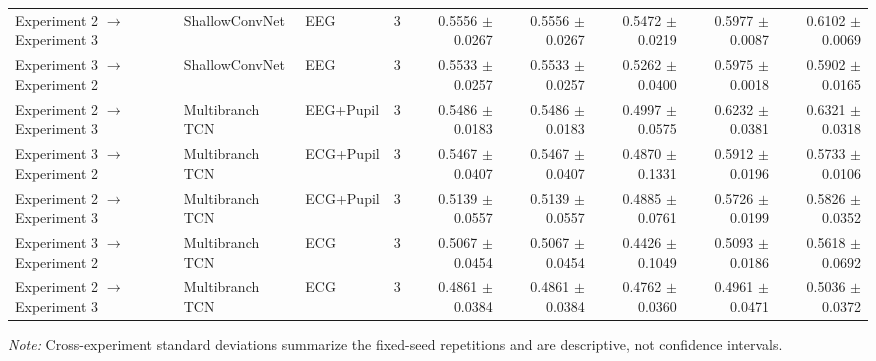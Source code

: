 \begin{table}[htbp]
{\begin{tabular}{lllrrrrrr}
Experiment 2 $\rightarrow$ Experiment 3 & ShallowConvNet & EEG & 3 & 0.5556 $\pm$ 0.0267 & 0.5556 $\pm$ 0.0267 & 0.5472 $\pm$ 0.0219 & 0.5977 $\pm$ 0.0087 & 0.6102 $\pm$ 0.0069 \\
Experiment 3 $\rightarrow$ Experiment 2 & ShallowConvNet & EEG & 3 & 0.5533 $\pm$ 0.0257 & 0.5533 $\pm$ 0.0257 & 0.5262 $\pm$ 0.0400 & 0.5975 $\pm$ 0.0018 & 0.5902 $\pm$ 0.0165 \\
Experiment 2 $\rightarrow$ Experiment 3 & Multibranch TCN & EEG+Pupil & 3 & 0.5486 $\pm$ 0.0183 & 0.5486 $\pm$ 0.0183 & 0.4997 $\pm$ 0.0575 & 0.6232 $\pm$ 0.0381 & 0.6321 $\pm$ 0.0318 \\
Experiment 3 $\rightarrow$ Experiment 2 & Multibranch TCN & ECG+Pupil & 3 & 0.5467 $\pm$ 0.0407 & 0.5467 $\pm$ 0.0407 & 0.4870 $\pm$ 0.1331 & 0.5912 $\pm$ 0.0196 & 0.5733 $\pm$ 0.0106 \\
Experiment 2 $\rightarrow$ Experiment 3 & Multibranch TCN & ECG+Pupil & 3 & 0.5139 $\pm$ 0.0557 & 0.5139 $\pm$ 0.0557 & 0.4885 $\pm$ 0.0761 & 0.5726 $\pm$ 0.0199 & 0.5826 $\pm$ 0.0352 \\
Experiment 3 $\rightarrow$ Experiment 2 & Multibranch TCN & ECG & 3 & 0.5067 $\pm$ 0.0454 & 0.5067 $\pm$ 0.0454 & 0.4426 $\pm$ 0.1049 & 0.5093 $\pm$ 0.0186 & 0.5618 $\pm$ 0.0692 \\
Experiment 2 $\rightarrow$ Experiment 3 & Multibranch TCN & ECG & 3 & 0.4861 $\pm$ 0.0384 & 0.4861 $\pm$ 0.0384 & 0.4762 $\pm$ 0.0360 & 0.4961 $\pm$ 0.0471 & 0.5036 $\pm$ 0.0372 \\
\bottomrule
\end{tabular}%
}
\par\medskip\footnotesize\textit{Note:} Cross-experiment standard deviations summarize the fixed-seed repetitions and are descriptive, not confidence intervals.
\end{table}
